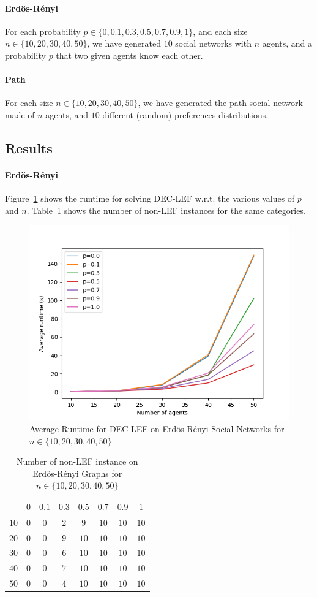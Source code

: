 \documentclass{article}
\begin{document}
\paragraph{Erd\"os-R\'enyi} For each probability $p \in \{0, 0.1, 0.3, 0.5, 0.7, 0.9, 1\}$, and each size $n \in \{10,20,30,40,50\}$, we have generated $10$ social networks with $n$ agents, and a probability $p$ that two given agents know each other.

\paragraph{Path} For each size $n \in \{10,20,30,40,50\}$, we have generated the path social network made of $n$ agents, and $10$ different (random) preferences distributions.

\subsection{Results}
\paragraph{Erd\"os-R\'enyi} Figure~\ref{fig:runtime-erdos-renyi} shows the runtime for solving DEC-LEF w.r.t. the various values of  $p$ and $n$. Table~\ref{tab:non-lef-erdos-renyi} shows the number of non-LEF instances for the same categories.

\begin{figure}[htb]
\centering
\includegraphics[width=0.5\linewidth]{results-runtime-ER.png}
\caption{Average Runtime for DEC-LEF on Erd\"os-R\'enyi Social Networks for $n \in \{10,20,30,40,50\}$\label{fig:runtime-erdos-renyi}}
\end{figure}

\begin{table}[htb]
\centering
\begin{tabular}{|c|c|c|c|c|c|c|c|}
	\hline
	\backslashbox{$n$}{$p$} & $0$ & $0.1$ & $0.3$ & $0.5$ & $0.7$ & $0.9$ & $1$ \\ \hline
	$10$ & $0$ & $0$ & $2$ & $9$ & $10$ & $10$ & $10$ \\
	$20$ & $0$ & $0$ & $9$ & $10$ & $10$ & $10$ & $10$ \\
	$30$ & $0$ & $0$ & $6$ & $10$ & $10$ & $10$ & $10$ \\
	$40$ & $0$ & $0$ & $7$ & $10$ & $10$ & $10$ & $10$ \\
	$50$ & $0$ & $0$ & $4$ & $10$ & $10$ & $10$ & $10$ \\
	\hline
\end{tabular}
\caption{Number of non-LEF instance on Erd\"os-R\'enyi Graphs for $n \in \{10,20,30,40,50\}$\label{tab:non-lef-erdos-renyi}}
\end{table}
\end{document}
